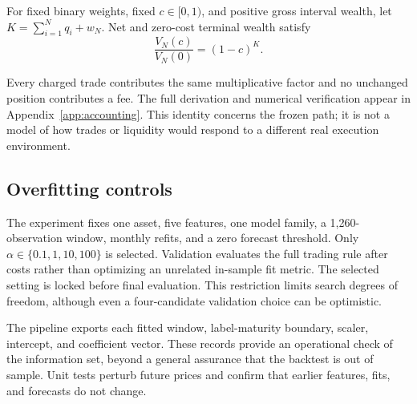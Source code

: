 \begin{proposition}
\label{prop:drag}
For fixed binary weights, fixed $c\in[0,1)$, and positive gross interval wealth, let $K=\sum_{i=1}^N q_i+w_N$. Net and zero-cost terminal wealth satisfy
\begin{equation}
 \frac{V_N(c)}{V_N(0)}=(1-c)^K.
 \label{eq:drag}
\end{equation}
\end{proposition}
Every charged trade contributes the same multiplicative factor and no unchanged position contributes a fee. The full derivation and numerical verification appear in Appendix~\ref{app:accounting}. This identity concerns the frozen path; it is not a model of how trades or liquidity would respond to a different real execution environment.

\subsection{Overfitting controls}
The experiment fixes one asset, five features, one model family, a 1,260-observation window, monthly refits, and a zero forecast threshold. Only $\alpha\in\{0.1,1,10,100\}$ is selected. Validation evaluates the full trading rule after costs rather than optimizing an unrelated in-sample fit metric. The selected setting is locked before final evaluation. This restriction limits search degrees of freedom, although even a four-candidate validation choice can be optimistic.

The pipeline exports each fitted window, label-maturity boundary, scaler, intercept, and coefficient vector. These records provide an operational check of the information set, beyond a general assurance that the backtest is out of sample. Unit tests perturb future prices and confirm that earlier features, fits, and forecasts do not change.
